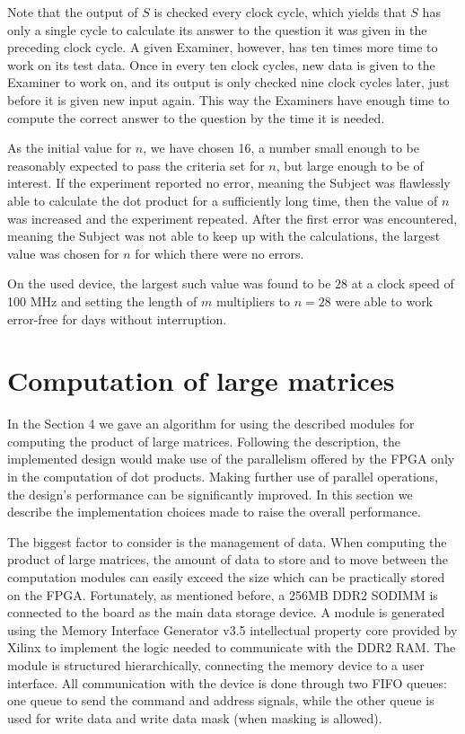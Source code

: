 \documentclass[11pt,twoside]{article}
\begin{document}
Note that the output of $S$ is checked every clock cycle, which yields that $S$ has only a single cycle to calculate its answer to the question it was given in the preceding clock cycle. A given Examiner, however, has ten times more time to work on its test data. Once in every ten clock cycles, new data is given to the Examiner to work on, and its output is only checked nine clock cycles later, just before it is given new input again. This way the Examiners have enough time to compute the correct answer to the question by the time it is needed.

As the initial value for $n$, we have chosen 16, a number small enough to be reasonably expected to pass the criteria set for $n$, but large enough to be of interest. If the experiment reported no error, meaning the Subject was flawlessly able to calculate the dot product for a sufficiently long time, then the value of $n$ was increased and the experiment repeated. After the first error was encountered, meaning the Subject was not able to keep up with the calculations, the largest value was chosen for $n$ for which there were no errors.

On the used device, the largest such value was found to be $28$ at a clock speed of 100 MHz and setting the length of $m$ multipliers to $n=28$ were able to work error-free for days without interruption.

\section{Computation of large matrices}

In the Section 4 we gave an algorithm for using the described modules for computing the product of large matrices. Following the description, the implemented design would make use of the parallelism offered by the FPGA only in the computation of dot products. Making further use of parallel operations, the design's performance can be significantly improved. In this section we describe the implementation choices made to raise the overall performance.

The biggest factor to consider is the management of data. When computing the product of large matrices, the amount of data to store and to move between the computation modules can easily exceed the size which can be practically stored on the FPGA. Fortunately, as mentioned before, a 256MB DDR2 SODIMM is connected to the board as the main data storage device. A module is generated using the Memory Interface Generator v3.5 intellectual property core provided by Xilinx to implement the logic needed to communicate with the DDR2 RAM. The module is structured hierarchically, connecting the memory device to a user interface. All communication with the device is done through two FIFO queues: one queue to send the command and address signals, while the other queue is used for write data and write data mask (when masking is allowed).
\end{document}
